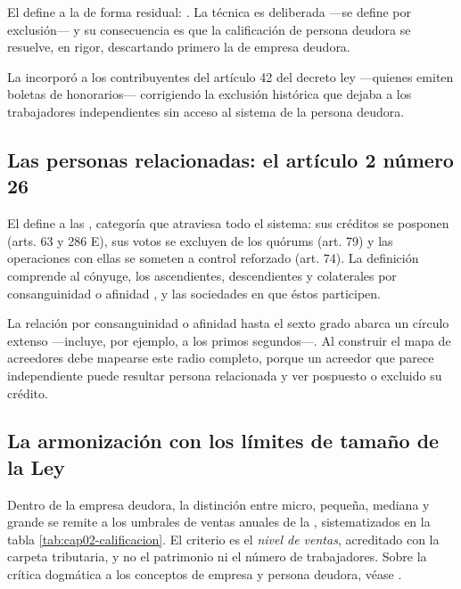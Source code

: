 El   define a la \personadeudora{} de forma residual: . La técnica es deliberada ---se
define por exclusión--- y su consecuencia es que la calificación de persona deudora se
resuelve, en rigor, descartando primero la de empresa deudora.

La \Lreforma{} \citeyearpar{ley-21563} incorporó a los contribuyentes del artículo 42 
del decreto ley 
---quienes emiten boletas de honorarios--- corrigiendo la exclusión histórica que dejaba a los
trabajadores independientes sin acceso al sistema de la persona deudora.

\subsection{Las personas relacionadas: el artículo 2 número 26}

El   define a las , categoría que atraviesa todo
el sistema: sus créditos se posponen (arts. 63 y 286 E), sus votos se excluyen de los quórums
(art. 79) y las operaciones con ellas se someten a control reforzado (art. 74). La definición
comprende al cónyuge, los ascendientes, descendientes y colaterales por consanguinidad o
afinidad , y las sociedades en que éstos participen.

\begin{alerta}
La relación por consanguinidad o afinidad hasta el sexto grado abarca un círculo extenso
---incluye, por ejemplo, a los primos segundos---. Al construir el mapa de acreedores debe
mapearse este radio completo, porque un acreedor que parece independiente puede resultar
persona relacionada y ver pospuesto o excluido su crédito.
\end{alerta}

\subsection{La armonización con los límites de tamaño de la Ley }

Dentro de la empresa deudora, la distinción entre micro, pequeña, mediana y grande se remite a
los umbrales de ventas anuales de la \Lpyme{} \citeyearpar{ley-20416}, sistematizados en la
tabla \ref{tab:cap02-calificacion}. El criterio es el \emph{nivel de ventas}, acreditado con la
carpeta tributaria, y no el patrimonio ni el número de trabajadores. Sobre la crítica dogmática
a los conceptos de empresa y persona deudora, véase \textcite{doc-empresa-persona-deudora}.


